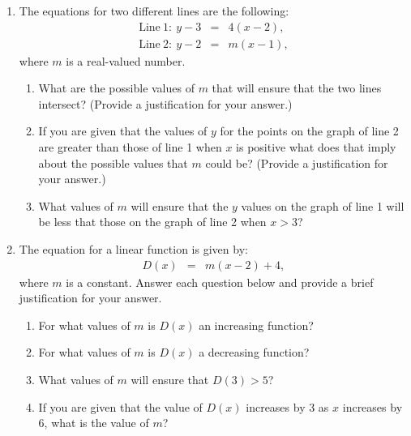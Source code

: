 \begin{enumerate}
\clearpage

\item The equations for two different lines are the
  following:
  \begin{eqnarray*}
    \mathrm{Line~1:~} y-3 & = & 4 (x-2), \\
    \mathrm{Line~2:~} y-2 & = & m (x-1),
  \end{eqnarray*}
  where $m$ is a real-valued number.

  \begin{enumerate}
  \item What are the possible values of $m$ that will ensure that the
    two lines intersect? (Provide a justification for your answer.)

    \vfill
  
  \item If you are given that the values of $y$ for the points on the
    graph of line 2 are greater than those of line 1 when $x$ is positive
    what does that imply about the possible values that $m$ could be?
    (Provide a justification for your answer.)

    \vfill

  \item What values of $m$ will ensure that the $y$ values on the
    graph of line 1 will be less that those on the graph of line 2
    when $x>3$?

    \vfill

  \end{enumerate}

\clearpage
\item The equation for a linear function is given by:
  \begin{eqnarray*}
    D(x) & = & m(x-2)+4,
  \end{eqnarray*}
  where $m$ is a constant. Answer each question below and provide
  a brief justification for your answer.

  \begin{enumerate}
  \item For what values of $m$ is $D(x)$ an increasing function?
    \vfill
  \item For what values of $m$ is $D(x)$ a decreasing function?
    \vfill
  \item What values of $m$ will ensure that $D(3)>5$?
    \vfill
  \item If you are given that the value of $D(x)$ increases by 3 as
    $x$ increases by 6, what is the value of $m$? 
    \vfill
  \end{enumerate}


\end{enumerate}



